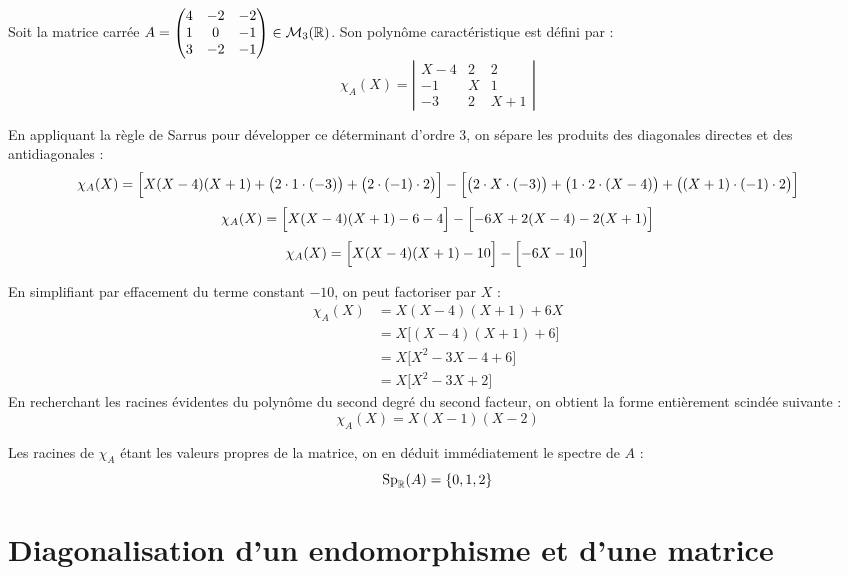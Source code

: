 \documentclass[12pt, a4paper]{report}
\begin{document}
\begin{example}
    Soit la matrice carrée $A = \begin{pmatrix} 4 & -2 & -2 \\ 1 & 0 & -1 \\ 3 & -2 & -1 \end{pmatrix} \in \mathcal{M}_3(\mathbb{R})$. 
    Son polynôme caractéristique est défini par :
    $$\chi_A(X) = \left|\begin{matrix} X-4 & 2 & 2 \\ -1 & X & 1 \\ -3 & 2 & X+1 \end{matrix}\right|$$
    
    En appliquant la règle de Sarrus pour développer ce déterminant d'ordre 3, on sépare les produits des diagonales directes et des antidiagonales :
    $$\chi_A(X) = \Bigl[ X(X-4)(X+1) + \bigl(2 \cdot 1 \cdot (-3)\bigr) + \bigl(2 \cdot (-1) \cdot 2\bigr) \Bigr] - \Bigl[ \bigl(2 \cdot X \cdot (-3)\bigr) + \bigl(1 \cdot 2 \cdot (X-4)\bigr) + \bigl((X+1) \cdot (-1) \cdot 2\bigr) \Bigr]$$
    $$\chi_A(X) = \Bigl[ X(X-4)(X+1) - 6 - 4 \Bigr] - \Bigl[ -6X + 2(X-4) - 2(X+1) \Bigr]$$
    $$\chi_A(X) = \Bigl[ X(X-4)(X+1) - 10 \Bigr] - \Bigl[ -6X - 10 \Bigr]$$
    
    En simplifiant par effacement du terme constant $-10$, on peut factoriser par $X$ :
    \begin{align*}
        \chi_A(X) &= X(X-4)(X+1) + 6X \\
        &= X \bigl[ (X-4)(X+1) + 6 \bigr] \\
        &= X \bigl[ X^2 - 3X - 4 + 6 \bigr] \\
        &= X \bigl[ X^2 - 3X + 2 \bigr]
    \end{align*}
    En recherchant les racines évidentes du polynôme du second degré du second facteur, on obtient la forme entièrement scindée suivante :
    $$\chi_A(X) = X(X-1)(X-2)$$
    
    Les racines de $\chi_A$ étant les valeurs propres de la matrice, on en déduit immédiatement le spectre de $A$ :
    $$\text{Sp}_{\mathbb{R}}(A) = \{0, 1, 2\}$$
\end{example}

\section{Diagonalisation d'un endomorphisme et d'une matrice}
\end{document}
